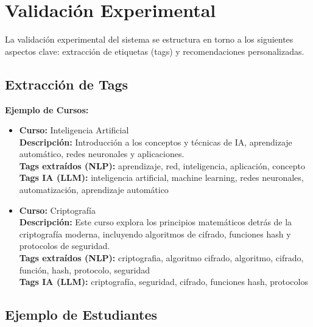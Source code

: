 \documentclass[12pt]{article}
\begin{document}
\section{Validación Experimental}

La validación experimental del sistema se estructura en torno a los siguientes aspectos clave: extracción de etiquetas (tags) y recomendaciones personalizadas.

\subsection{Extracción de Tags}

\textbf{Ejemplo de Cursos:}

\begin{itemize}
    \item \textbf{Curso:} Inteligencia Artificial\\
    \textbf{Descripción:} Introducción a los conceptos y técnicas de IA, aprendizaje automático, redes neuronales y aplicaciones.\\
    \textbf{Tags extraídos (NLP):} aprendizaje, red, inteligencia, aplicación, concepto\\
    \textbf{Tags IA (LLM):} inteligencia artificial, machine learning, redes neuronales, automatización, aprendizaje automático

    \item \textbf{Curso:} Criptografía\\
    \textbf{Descripción:} Este curso explora los principios matemáticos detrás de la criptografía moderna, incluyendo algoritmos de cifrado, funciones hash y protocolos de seguridad.\\
    \textbf{Tags extraídos (NLP):} criptografia, algoritmo cifrado, algoritmo, cifrado, función, hash, protocolo, seguridad\\
    \textbf{Tags IA (LLM):} criptografía, seguridad, cifrado, funciones hash, protocolos
\end{itemize}

\subsection{Ejemplo de Estudiantes}
\end{document}
